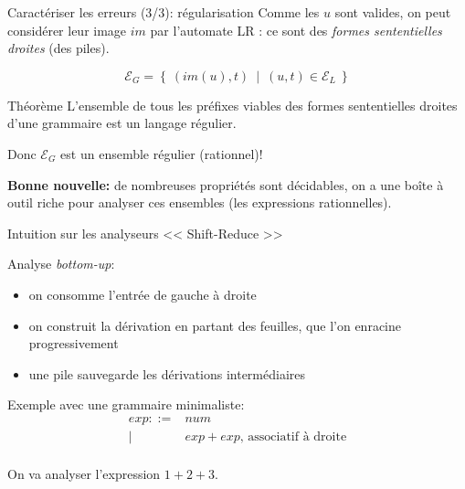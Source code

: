\documentclass{beamer}          %
\begin{document}
\begin{frame}{Caractériser les erreurs (3/3): régularisation}
  Comme les $u$ sont valides, on peut considérer leur image $im$ par l'automate LR : ce sont des {\em formes sententielles droites} (des piles).

  $$
  \mathcal E_G = \left\{\ (im(u), t)\ \mid\ (u, t) \in \mathcal E_L\ \right\}
  $$

  \pause
  \begin{block}{Théorème}
  L'ensemble de tous les préfixes viables des formes sententielles droites
  d'une grammaire est un langage régulier.
  \end{block}

  \pause

  Donc $\mathcal E_G$ est un ensemble régulier (rationnel)!

  \textbf{Bonne nouvelle:} de nombreuses propriétés sont décidables, on
  a une boîte à outil riche pour analyser ces ensembles (les expressions
  rationnelles).

\end{frame}

\begin{frame}{Intuition sur les analyseurs << Shift-Reduce >>}

  Analyse {\em bottom-up}:
  \begin{itemize}
    \item on consomme l'entrée de gauche à droite
    \item on construit la dérivation en partant des feuilles,
          que l'on enracine progressivement
    \item une pile sauvegarde les dérivations intermédiaires
  \end{itemize}

  \pause

  Exemple avec une grammaire minimaliste:
  $$
  \begin{array}{rl}
    exp ::= & num \\
          | & exp + exp \text{, associatif à droite}\\
  \end{array}
  $$

  On va analyser l'expression $1+2+3$.
\end{frame}
\end{document}
